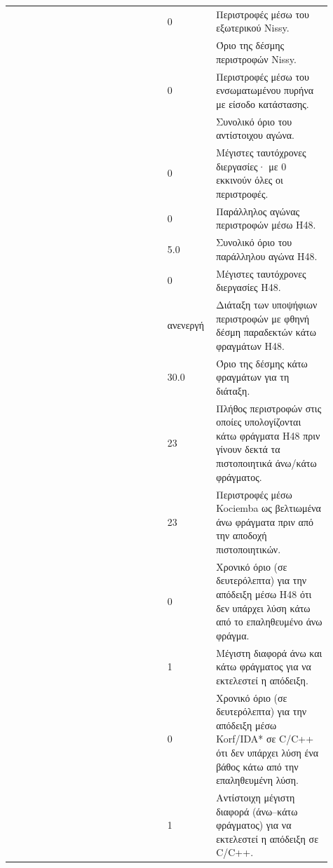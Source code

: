 {\begin{longtable}{@{}L{0.46\linewidth}L{0.11\linewidth}L{0.34\linewidth}@{}}
 & 0 & Περιστροφές μέσω του εξωτερικού Nissy. \\
 &  & Όριο της δέσμης περιστροφών Nissy. \\
\allowbreak{} & 0 & Περιστροφές μέσω του ενσωματωμένου πυρήνα με είσοδο κατάστασης. \\
\allowbreak{} &  & Συνολικό όριο του αντίστοιχου αγώνα. \\
\allowbreak{} & 0 & Μέγιστες ταυτόχρονες διεργασίες· με 0 εκκινούν όλες οι περιστροφές. \\
 & 0 & Παράλληλος αγώνας περιστροφών μέσω H48. \\
 & 5.0 & Συνολικό όριο του παράλληλου αγώνα H48. \\
\allowbreak{} & 0 & Μέγιστες ταυτόχρονες διεργασίες H48. \\
\allowbreak{} & ανενεργή & Διάταξη των υποψήφιων περιστροφών με φθηνή δέσμη παραδεκτών κάτω φραγμάτων H48. \\
\allowbreak{} & 30.0 & Όριο της δέσμης κάτω φραγμάτων για τη διάταξη. \\
\allowbreak{} & 23 & Πλήθος περιστροφών στις οποίες υπολογίζονται κάτω φράγματα H48 πριν γίνουν δεκτά τα πιστοποιητικά άνω/κάτω φράγματος. \\
\allowbreak{} & 23 & Περιστροφές μέσω Kociemba ως βελτιωμένα άνω φράγματα πριν από την αποδοχή πιστοποιητικών. \\
 & 0 & Χρονικό όριο (σε δευτερόλεπτα) για την απόδειξη μέσω H48 ότι δεν υπάρχει λύση κάτω από το επαληθευμένο άνω φράγμα. \\
 & 1 & Μέγιστη διαφορά άνω και κάτω φράγματος για να εκτελεστεί η απόδειξη. \\
\allowbreak{} & 0 & Χρονικό όριο (σε δευτερόλεπτα) για την απόδειξη μέσω Korf/IDA* σε C/C++ ότι δεν υπάρχει λύση ένα βάθος κάτω από την επαληθευμένη λύση. \\
\allowbreak{} & 1 & Αντίστοιχη μέγιστη διαφορά (άνω–κάτω φράγματος) για να εκτελεστεί η απόδειξη σε C/C++. \\
\end{longtable}
}

